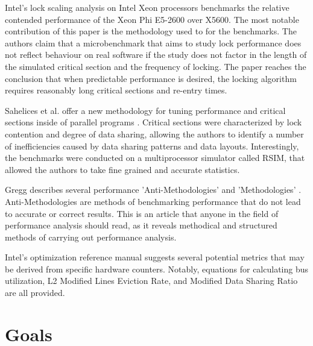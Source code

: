 \documentclass[a4paper, 12pt, titlepage]{article}
\begin{document}
\begin{onehalfspacing}
Intel's lock scaling analysis on Intel Xeon processors \cite{intelxeonlockscaling} benchmarks the relative contended performance of the Xeon Phi E5-2600 over X5600. The most notable contribution of this paper is the methodology used to for the benchmarks. The authors claim that a microbenchmark that aims to study lock performance does not reflect behaviour on real software if the study does not factor in the length of the simulated critical section and the frequency of locking. The paper reaches the conclusion that when predictable performance is desired, the locking algorithm requires reasonably long critical sections and re-entry times.

Sahelices et al. offer a new methodology for tuning performance and critical sections inside of parallel programs \cite{sahelices2009methodology}. Critical sections were characterized by lock contention and degree of data sharing, allowing the authors to identify a number of inefficiencies caused by data sharing patterns and data layouts. Interestingly, the benchmarks were conducted on a multiprocessor simulator called RSIM, that allowed the authors to take fine grained and accurate statistics.

Gregg describes several performance 'Anti-Methodologies' and 'Methodologies' \cite{methodologygregg}. Anti-Methodologies are methods of benchmarking performance that do not lead to accurate or correct results. This is an article that anyone in the field of performance analysis should read, as it reveals methodical and structured methods of carrying out performance analysis.

Intel's optimization reference manual \cite{intelmanualoptimization} suggests several potential metrics that may be derived from specific hardware counters. Notably, equations for calculating bus utilization, L2 Modified Lines Eviction Rate, and Modified Data Sharing Ratio are all provided.

\section{Goals}

\end{onehalfspacing}
\end{document}
